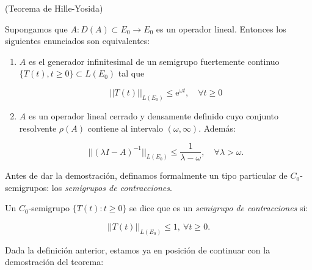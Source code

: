 \begin{Teorema}{(Teorema de Hille-Yosida)}
    \label{ch:semigrupos:th:HilleYosida}
    
    Supongamos que $A : D(A) \subset E_0 \rightarrow E_0$ es un operador lineal. Entonces los siguientes enunciados son equivalentes:

    \begin{enumerate}
        \item $A$ es el generador infinitesimal de un semigrupo fuertemente continuo $\{T(t), t \geq 0\} \subset L(E_0)$ tal que

        \[||T(t)||_{L(E_0)} \leq \mathrm{e}^{\omega t}, \quad \forall t \geq 0\]

        \item $A$ es un operador lineal cerrado y densamente definido cuyo conjunto resolvente $\rho(A)$ contiene al intervalo $(\omega, \infty)$. Además:

        \[||(\lambda I - A)^{-1}||_{L(E_0)} \leq \frac{1}{\lambda - \omega}, \quad \forall \lambda > \omega.\]
    \end{enumerate}
\end{Teorema}

Antes de dar la demostración, definamos formalmente un tipo particular de $C_0$-semigrupos: los \textit{semigrupos de contracciones}.\\

\begin{Definicion}
    \label{ch:semigrupos:def:semigrupoContract}
    Un $C_0$-semigrupo $\{T(t) : t \geq 0\}$ se dice que es un \textit{semigrupo de contracciones} si:

    \[||T(t)||_{L(E_0)} \leq 1, \ \forall t \geq 0.\]
\end{Definicion}

Dada la definición anterior, estamos ya en posición de continuar con la demostración del teorema:

